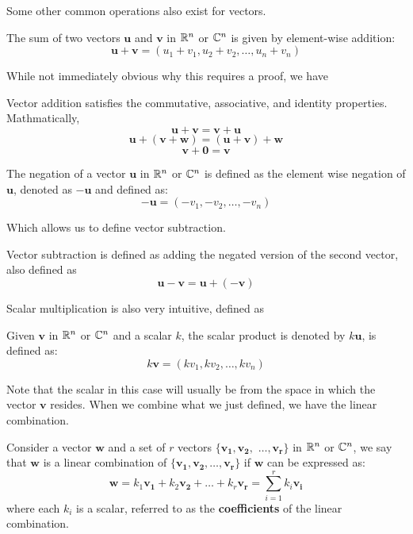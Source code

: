 \documentclass[12pt]{article}
\begin{document}
Some other common operations also exist for vectors.

\begin{definition}
    The sum of two vectors $\mathbf{u}$ and $\mathbf{v}$ in $\mathbb{R}^n$ or $\mathbb{C}^n$ is given by element-wise addition:
    $$\mathbf{u} + \mathbf{v} = (u_1 + v_1, u_2 + v_2, \ldots, u_n + v_n)$$
\end{definition}

While not immediately obvious why this requires a proof, we have 

\begin{theorem}
    Vector addition satisfies the commutative, associative, and identity properties. Mathmatically,
    $$\mathbf{u} + \mathbf{v} = \mathbf{v} + \mathbf{u}$$
    $$\mathbf{u} + (\mathbf{v} + \mathbf{w}) = (\mathbf{u} + \mathbf{v}) + \mathbf{w}$$
    $$\mathbf{v} + \mathbf{0} = \mathbf{v}$$
\end{theorem}


\begin{definition}
    The negation of a vector $\mathbf{u}$ in $\mathbb{R}^n$ or $\mathbb{C}^n$ is defined as the element wise negation of $\mathbf{u}$, denoted as $-\mathbf{u}$ and defined as:
    $$-\mathbf{u} = (-v_1, -v_2, \ldots, -v_n)$$
\end{definition}

Which allows us to define vector subtraction. 

\begin{definition}
    Vector subtraction is defined as adding the negated version of the second vector, also defined as $$\mathbf{u} - \mathbf{v} = \mathbf{u}+ (-\mathbf{v})$$
\end{definition}

Scalar multiplication is also very intuitive, defined as

\begin{definition}
    Given $\mathbf{v}$ in $\mathbb{R}^n$ or $\mathbb{C}^n$ and a scalar $k$, the scalar product is denoted by $k\mathbf{u}$, is defined as:
    $$k\mathbf{v} = (k v_1, k v_2, \ldots, k v_n)$$
\end{definition}

Note that the scalar in this case will usually be from the space in which the vector $\mathbf{v}$ resides. When we combine what we just defined, we have the linear combination. 

\begin{definition}
    Consider a vector $\mathbf{w}$ and a set of $r$ vectors $\{\mathbf{v_1}, \mathbf{v_2},$ $ \ldots, \mathbf{v_r}\}$ in $\mathbb{R}^n$ or $\mathbb{C}^n$, we say that $\mathbf{w}$ is a linear combination of $\{\mathbf{v_1}, \mathbf{v_2}, \ldots, \mathbf{v_r}\}$ if $\mathbf{w}$ can be expressed as:
    $$\mathbf{w} = k_1 \mathbf{v_1} + k_2 \mathbf{v_2} + \ldots + k_r \mathbf{v_r} = \sum_{i = 1}^{r} k_i \mathbf{v_i}$$ 
    where each $k_i$ is a scalar, referred to as the \textbf{coefficients} of the linear combination.
\end{definition}
\end{document}
